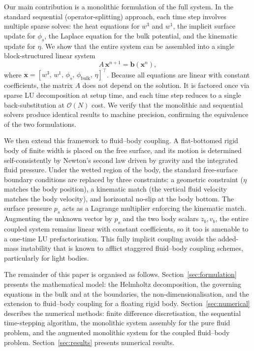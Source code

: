 \documentclass{article}
\newcommand{\xx}{\mathbf{x}}
\newcommand{\bb}{\mathbf{b}}
\newcommand{\OO}{\mathcal{O}}
\begin{document}
Our main contribution is a monolithic formulation of the full system.
In the standard sequential (operator-splitting) approach, each time step involves multiple sparse solves: the heat equations for $w^3$ and $w^1$, the implicit surface update for $\phi_s$, the Laplace equation for the bulk potential, and the kinematic update for $\eta$.
We show that the entire system can be assembled into a single block-structured linear system
\begin{equation*}
    A\,\xx^{n+1} = \bb(\xx^n),
\end{equation*}
where $\xx = [w^3,\, w^1,\, \phi_s,\, \phi_{\mathrm{bulk}},\, \eta]^\top$.
Because all equations are linear with constant coefficients, the matrix $A$ does not depend on the solution.
It is factored once via sparse LU decomposition at setup time, and each time step reduces to a single back-substitution at $\OO(N)$ cost.
We verify that the monolithic and sequential solvers produce identical results to machine precision, confirming the equivalence of the two formulations.

We then extend this framework to fluid--body coupling.
A flat-bottomed rigid body of finite width is placed on the free surface, and its motion is determined self-consistently by Newton's second law driven by gravity and the integrated fluid pressure.
Under the wetted region of the body, the standard free-surface boundary conditions are replaced by three constraints: a geometric constraint ($\eta$ matches the body position), a kinematic match (the vertical fluid velocity matches the body velocity), and horizontal no-slip at the body bottom.
The surface pressure $p_s$ acts as a Lagrange multiplier enforcing the kinematic match.
Augmenting the unknown vector by $p_s$ and the two body scalars $z_b, v_b$, the entire coupled system remains linear with constant coefficients, so it too is amenable to a one-time LU prefactorisation.
This fully implicit coupling avoids the added-mass instability that is known to afflict staggered fluid--body coupling schemes, particularly for light bodies.

The remainder of this paper is organised as follows.
Section~\ref{sec:formulation} presents the mathematical model: the Helmholtz decomposition, the governing equations in the bulk and at the boundaries, the non-dimensionalisation, and the extension to fluid--body coupling for a floating rigid body.
Section~\ref{sec:numerical} describes the numerical methods: finite difference discretisation, the sequential time-stepping algorithm, the monolithic system assembly for the pure fluid problem, and the augmented monolithic system for the coupled fluid--body problem.
Section~\ref{sec:results} presents numerical results.
\end{document}

